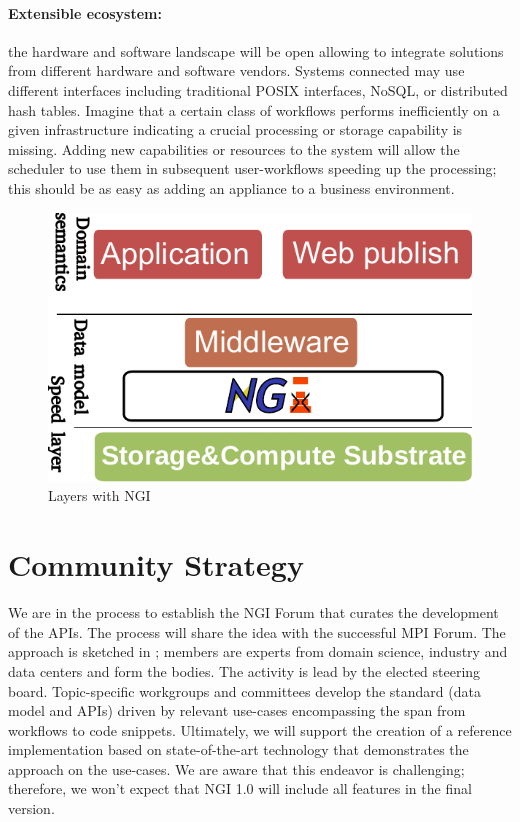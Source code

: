 \documentclass[a4paper, twocolumn]{article}
\begin{document}
\paragraph{Extensible ecosystem:}
the hardware and software landscape will be open allowing to integrate solutions from different hardware and software vendors.
Systems connected may use different interfaces including traditional POSIX interfaces, NoSQL, or distributed hash tables.
Imagine that a certain class of workflows performs inefficiently on a given infrastructure indicating a crucial processing or storage capability is missing.
Adding new capabilities or resources to the system will allow the scheduler to use them in subsequent user-workflows speeding up the processing; this should be as easy as adding an appliance to a business environment.



\begin{figure}[b]
  \centering
  \includegraphics[width=0.75\columnwidth]{layers-ngi}
  \caption{Layers with NGI}
  \label{fig:ngilayers}
\end{figure}



\section{Community Strategy}
\label{sec:community}

We are in the process to establish the NGI Forum that curates the development of the APIs.
The process will share the idea with the successful MPI Forum.
The approach is sketched in ;
members are experts from domain science, industry and data centers and form the bodies.
The activity is lead by the elected steering board.
Topic-specific workgroups and committees develop the standard (data model and APIs) driven by relevant use-cases encompassing the span from workflows to code snippets.
Ultimately, we will support the creation of a reference implementation based on state-of-the-art technology that demonstrates the approach on the use-cases.
We are aware that this endeavor is challenging; therefore, we won't expect that NGI 1.0 will include all features in the final version.
\end{document}
